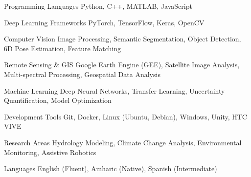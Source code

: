 
\begin{cvskills}

  \cvskill
    {Programming Languages} %
    {Python, C++, MATLAB, JavaScript} %

  \cvskill
    {Deep Learning Frameworks} %
    {PyTorch, TensorFlow, Keras, OpenCV} %

  \cvskill
    {Computer Vision} %
    {Image Processing, Semantic Segmentation, Object Detection, 6D Pose Estimation, Feature Matching} %

  \cvskill
    {Remote Sensing \& GIS} %
    {Google Earth Engine (GEE), Satellite Image Analysis, Multi-spectral Processing, Geospatial Data Analysis} %

  \cvskill
    {Machine Learning} %
    {Deep Neural Networks, Transfer Learning, Uncertainty Quantification, Model Optimization} %

  \cvskill
    {Development Tools} %
    {Git, Docker, Linux (Ubuntu, Debian), Windows, Unity, HTC VIVE} %

  \cvskill
    {Research Areas} %
    {Hydrology Modeling, Climate Change Analysis, Environmental Monitoring, Assistive Robotics} %

  \cvskill
    {Languages} %
    {English (Fluent), Amharic (Native), Spanish (Intermediate)} %

\end{cvskills}